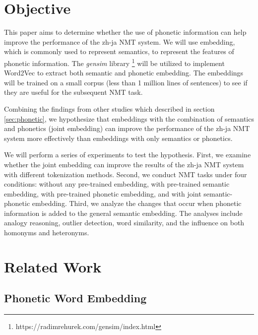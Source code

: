 \section{Objective} \label{sec:objective}

This paper aims to determine whether the use of phonetic information can help improve the performance of the zh-ja NMT system. We will use embedding, which is commonly used to represent semantics, to represent the features of phonetic information. The \textit{gensim} library \footnote{https://radimrehurek.com/gensim/index.html} will be utilized to implement Word2Vec \cite{mikolov2013distributed} to extract both semantic and phonetic embedding. The embeddings will be trained on a small corpus (less than 1 million lines of sentences) to see if they are useful for the subsequent NMT task.

Combining the findings from other studies \cite{liu-etal-2019-robust, khan2019diversity} which described in section \ref{sec:phonetic}, we hypothesize that embeddings with the combination of semantics and phonetics (joint embedding) can improve the performance of the zh-ja NMT system more effectively than embeddings with only semantics or phonetics. 

We will perform a series of experiments to test the hypothesis. First, we examine whether the joint embedding can improve the results of the zh-ja NMT system with different tokenization methods. Second, we conduct NMT tasks under four conditions: without any pre-trained embedding, with pre-trained semantic embedding, with pre-trained phonetic embedding, and with joint semantic-phonetic embedding. Third, we analyze the changes that occur when phonetic information is added to the general semantic embedding. The analyses include analogy reasoning, outlier detection, word similarity, and the influence on both homonyms and heteronyms.

\section{Related Work} \label{sec:related_work}



\subsection{Phonetic Word Embedding}


